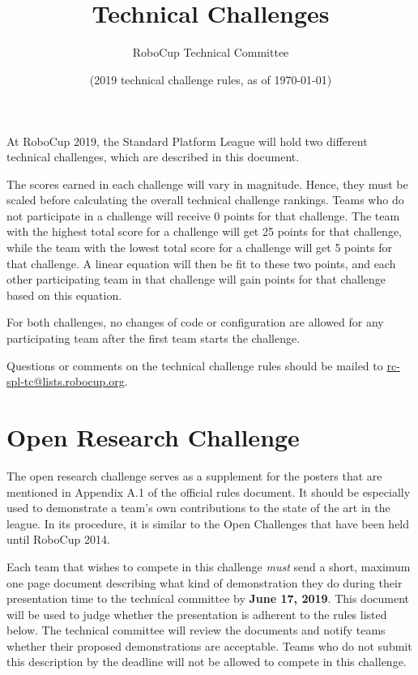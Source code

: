 \documentclass[12pt]{article}
\title{\leaguename\\Technical Challenges}
\author{RoboCup Technical Committee}
\date{(2019 technical challenge rules, as of \today)}
\begin{document}
\maketitle

At RoboCup 2019, the Standard Platform League will hold two different technical challenges, which are described in this document.

The scores earned in each challenge will vary in magnitude. Hence, they must be scaled before calculating the overall technical challenge rankings. Teams who do not participate in a challenge will receive 0 points for that challenge. The team with the highest total score for a challenge will get 25 points for that challenge, while the team with the lowest total score for a challenge will get 5 points for that challenge. A linear equation will then be fit to these two points, and each other participating team in that challenge will gain points for that challenge based on this equation.

For both challenges, no changes of code or configuration are allowed for any participating team after the first team starts the challenge.

Questions or comments on the technical challenge rules should be mailed to \url{rc-spl-tc@lists.robocup.org}.

\vfill
\tableofcontents
\setcounter{tocdepth}{3}
\thispagestyle{fancy}
\clearpage
\cfoot{\thepage}
\setcounter{page}{1}

\section{Open Research Challenge}

The open research challenge serves as a supplement for the posters that are mentioned in Appendix A.1 of the official rules document. It should be especially used to demonstrate a team's own contributions to the state of the art in the league. In its procedure, it is similar to the Open Challenges that have been held until RoboCup 2014.

Each team that wishes to compete in this challenge \emph{must} send a short, maximum one page document describing what kind of demonstration they do during their presentation time to the technical committee by \textbf{June 17, 2019}. This document will be used to judge whether the presentation is adherent to the rules listed below. The technical committee will review the documents and notify teams whether their proposed demonstrations are acceptable. Teams who do not submit this description by the deadline will not be allowed to compete in this challenge.
\end{document}
